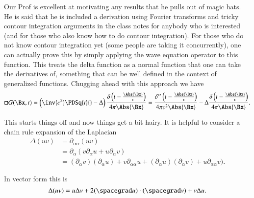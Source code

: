 %
%

Our Prof is excellent at motivating any results that he pulls out of magic hats.  He is said that he is included a derivation using Fourier transforms and tricky contour integration arguments in the class notes for anybody who is interested (and for those who also know how to do contour integration).  For those who do not know contour integration yet (some people are taking it concurrently), one can actually prove this by simply applying the wave equation operator to this function.  This treats the delta function as a normal function that one can take the derivatives of, something that can be well defined in the context of generalized functions.  Chugging ahead with this approach we have
%
\begin{equation}\label{eqn:relativisticElectrodynamicsL18:110}
\square G(\Bx, t)
=
\left(\inv{c^2} \PDSq{t}{} - \Delta\right)
\frac{\delta\left(t - \frac{\Abs{\Bx}}{c}\right)}{4 \pi \Abs{\Bx} }
=
\frac{\delta''\left(t - \frac{\Abs{\Bx}}{c}\right)}{4 \pi c^2 \Abs{\Bx} }
- \Delta \frac{\delta\left(t - \frac{\Abs{\Bx}}{c}\right)}{4 \pi \Abs{\Bx} }.
\end{equation}

This starts things off and now things get a bit hairy.  It is helpful to consider a chain rule expansion of the Laplacian
%
\begin{equation}\label{eqn:relativisticElectrodynamicsL18:760}
\begin{aligned}
\Delta (u v)
&=
\partial_{\alpha\alpha} (u v) \\
&=
\partial_{\alpha} (
v \partial_\alpha u
+ u\partial_\alpha v
) \\
&=
(\partial_\alpha v) (\partial_\alpha u ) + v \partial_{\alpha\alpha} u
+(\partial_\alpha u) (\partial_\alpha v ) + u \partial_{\alpha\alpha} v
).
\end{aligned}
\end{equation}

In vector form this is
%
\begin{equation}\label{eqn:relativisticElectrodynamicsL18:130}
\Delta (u v) = u \Delta v + 2 (\spacegrad u) \cdot (\spacegrad v) + v \Delta u.
\end{equation}

